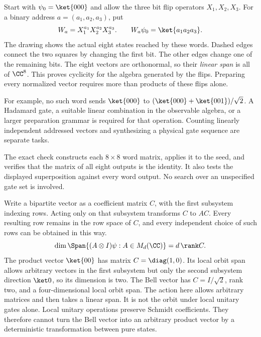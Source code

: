 Start with $\psi_0=\ket{000}$ and allow the three bit flip operators $X_1,X_2,X_3$. For a binary address $a=(a_1,a_2,a_3)$, put
\[
W_a=X_1^{a_1}X_2^{a_2}X_3^{a_3}.
\qquad W_a\psi_0=\ket{a_1a_2a_3}.
\]
The drawing shows the actual eight states reached by these words. Dashed edges connect the two squares by changing the first bit. The other edges change one of the remaining bits.
The eight vectors are orthonormal, so their \emph{linear span} is all of $\CC^8$. This proves cyclicity for the algebra generated by the flips. Preparing every normalized vector requires more than products of these flips alone.

For example, no such word sends $\ket{000}$ to $(\ket{000}+\ket{001})/\sqrt2$. A Hadamard gate, a suitable linear combination in the observable algebra, or a larger preparation grammar is required for that operation. Counting linearly independent addressed vectors and synthesizing a physical gate sequence are separate tasks.

The exact check constructs each $8\times8$ word matrix, applies it to the seed, and verifies that the matrix of all eight outputs is the identity. It also tests the displayed superposition against every word output. No search over an unspecified gate set is involved.

Write a bipartite vector as a coefficient matrix $C$, with the first subsystem indexing rows. Acting only on that subsystem transforms $C$ to $AC$. Every resulting row remains in the row space of $C$, and every independent choice of such rows can be obtained in this way.
\[
\dim\Span\{(A\otimes I)\psi:A\in M_d(\CC)\}
=d\,\rank C.
\]
The product vector $\ket{00}$ has matrix $C=\diag(1,0)$. Its local orbit span allows arbitrary vectors in the first subsystem but only the second subsystem direction $\ket0$, so its dimension is two. The Bell vector has $C=I/\sqrt2$, rank two, and a four-dimensional local orbit span.
The action here allows arbitrary matrices and then takes a linear span. It is not the orbit under local unitary gates alone. Local unitary operations preserve Schmidt coefficients. They therefore cannot turn the Bell vector into an arbitrary product vector by a deterministic transformation between pure states.

